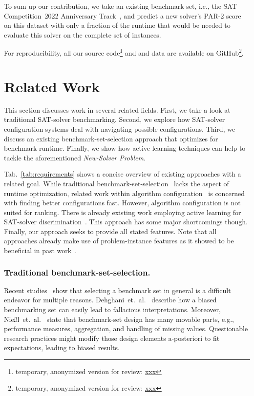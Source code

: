 \documentclass[runningheads]{llncs}
\begin{document}
To sum up our contribution, we take an existing benchmark set, i.e., the SAT Competition~2022 Anniversary Track~\cite{sat2022}, and predict a new solver's PAR-2 score on this dataset with only a fraction of the runtime that would be needed to evaluate this solver on the complete set of instances.

For reproducibility, all our source code\footnote{temporary, anonymized version for review: \url{xxx}} and and data are available on GitHub\footnote{temporary, anonymized version for review: \url{xxx}}.


\section{Related Work}
This section discusses work in several related fields.
First, we take a look at traditional SAT-solver benchmarking.
Second, we explore how SAT-solver configuration systems deal with navigating possible configurations.
Third, we discuss an existing benchmark-set-selection approach that optimizes for benchmark runtime.
Finally, we show how active-learning techniques can help to tackle the aforementioned \emph{New-Solver Problem}.

Tab.~\ref{tab:requirements} shows a concise overview of existing approaches with a related goal.
While traditional benchmark-set-selection~\cite{HoosKSS13} lacks the aspect of runtime optimization, related work within algorithm configuration~\cite{HutterHL11} is concerned with finding better configurations fast.
However, algorithm configuration is not suited for ranking.
There is already existing work employing active learning for SAT-solver discrimination~\cite{MatriconAFSH21}.
This approach has some major shortcomings though.
Finally, our approach seeks to provide all stated features.
Note that all approaches already make use of problem-instance features as it showed to be beneficial in past work~\cite{HoosKSS13,CollauttiMMO13,NgokoCT19}.

\subsubsection{Traditional benchmark-set-selection.}
Recent studies~\cite{abs-2107-07002,NiesslHWCB22} show that selecting a benchmark set in general is a difficult endeavor for multiple reasons.
Dehghani~et.~al.~\cite{abs-2107-07002} describe how a biased benchmarking set can easily lead to fallacious interpretations.
Moreover, Nießl~et.~al.~\cite{NiesslHWCB22} state that benchmark-set design has many movable parts, e.g., performance measures, aggregation, and handling of missing values.
Questionable research practices might modify those design elements a-posteriori to fit expectations, leading to biased results.
\end{document}
